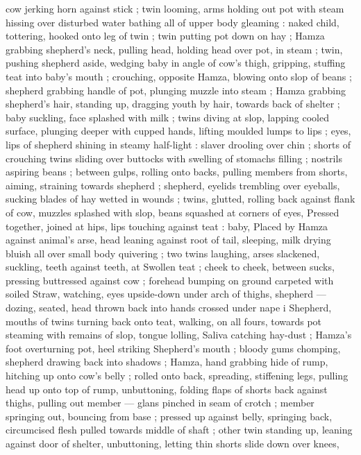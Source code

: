 {cow jerking horn against stick ; twin looming, arms holding out pot 
with steam hissing over disturbed water bathing all of upper body 
gleaming : naked child, tottering, hooked onto leg of twin ; twin 
putting pot down on hay ; Hamza grabbing shepherd's neck, pulling 
head, holding head over pot, in steam ; twin, pushing shepherd 
aside, wedging baby in angle of cow's thigh, gripping, stuffing teat 
into baby's mouth ; crouching, opposite Hamza, blowing onto slop of 
beans ; shepherd grabbing handle of pot, plunging muzzle into 
steam ; Hamza grabbing shepherd's hair, standing up, dragging 
youth by hair, towards back of shelter ; baby suckling, face splashed 
with milk ; twins diving at slop, lapping cooled surface, plunging 
deeper with cupped hands, lifting moulded lumps to lips ; eyes, lips 
of shepherd shining in steamy half-light : slaver drooling over chin ; 
shorts of crouching twins sliding over buttocks with swelling of 
stomachs filling ; nostrils aspiring beans ; between gulps, rolling onto 
backs, pulling members from shorts, aiming, straining towards 
shepherd ; shepherd, eyelids trembling over eyeballs, sucking blades 
of hay wetted in wounds ; twins, glutted, rolling back against flank of 
cow, muzzles splashed with slop, beans squashed at corners of eyes, 
Pressed together, joined at hips, lips touching against teat : baby, 
Placed by Hamza against animal's arse, head leaning against root of 
tail, sleeping, milk drying bluish all over small body quivering ; two 
twins laughing, arses slackened, suckling, teeth against teeth, at 
Swollen teat ; cheek to cheek, between sucks, pressing buttressed 
against cow ; forehead bumping on ground carpeted with soiled 
Straw, watching, eyes upside-down under arch of thighs, shepherd 
--- dozing, seated, head thrown back into hands crossed under nape 
i Shepherd, mouths of twins turning back onto teat, walking, on all 
fours, towards pot steaming with remains of slop, tongue lolling, 
Saliva catching hay-dust ; Hamza's foot overturning pot, heel striking 
Shepherd's mouth ; bloody gums chomping, shepherd drawing back 
into shadows ; Hamza, hand grabbing hide of rump, hitching up onto 
cow's belly ; rolled onto back, spreading, stiffening legs, pulling 
head up onto top of rump, unbuttoning, folding flaps of shorts back 
against thighs, pulling out member --- glans pinched in seam of 
crotch ; member springing out, bouncing from base ; pressed up 
against belly, springing back, circumcised flesh pulled towards 
middle of shaft ; other twin standing up, leaning against door of 
shelter, unbuttoning, letting thin shorts slide down over knees, 
}
